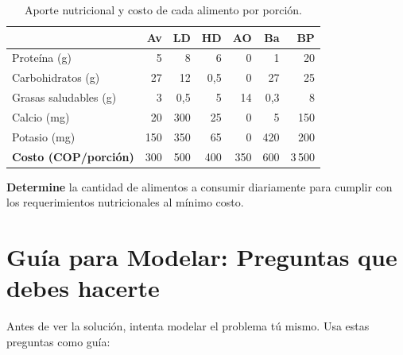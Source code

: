 \documentclass[12pt]{article}
\begin{document}
\begin{table}[h]
\centering
\begin{tabular}{l *{6}{r}}
\toprule
& \textbf{Av} & \textbf{LD} & \textbf{HD} & \textbf{AO}
& \textbf{Ba} & \textbf{BP} \\
\midrule
Prote\'ina (g)           & 5    & 8     & 6    & 0    & 1    & 20   \\
Carbohidratos (g)        & 27   & 12    & 0,5  & 0    & 27   & 25   \\
Grasas saludables (g)    & 3    & 0,5   & 5    & 14   & 0,3  & 8    \\
Calcio (mg)              & 20   & 300   & 25   & 0    & 5    & 150  \\
Potasio (mg)             & 150  & 350   & 65   & 0    & 420  & 200  \\
\midrule
\textbf{Costo (COP/porci\'on)} & 300 & 500 & 400 & 350 & 600 & 3\,500 \\
\bottomrule
\end{tabular}
\caption{Aporte nutricional y costo de cada alimento por porci\'on.}
\end{table}

\textbf{Determine} la cantidad de alimentos a consumir diariamente para cumplir con los requerimientos nutricionales al m\'inimo costo.

\newpage

\section{Gu\'ia para Modelar: Preguntas que debes hacerte}

Antes de ver la soluci\'on, intenta modelar el problema t\'u mismo. Usa estas preguntas como gu\'ia:
\end{document}
